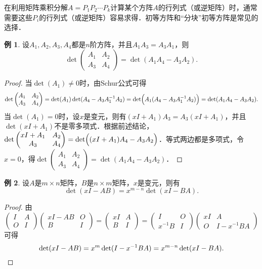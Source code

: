 \documentclass[a4paper,fontset=windows]{ctexbook}
\theoremstyle{definition}
\newtheorem{example}{例}[chapter]
\begin{document}
\medskip 在利用矩阵乘积分解$A=P_1P_2\cdots P_k$计算某个方阵$A$的行列式（或逆矩阵）时，通常需要这些$P_i$的行列式（或逆矩阵）容易求得．初等方阵和“分块”初等方阵是常见的选择．

\begin{example}
设$A_1,A_2,A_3,A_4$都是$n$阶方阵，并且$A_1A_3=A_3A_1$，则
$$\det\begin{pmatrix}A_1&A_2 \\ A_3&A_4\end{pmatrix}=\det(A_1A_4-A_3A_2).$$
\end{example}

\begin{proof}
当$\det(A_1)\ne 0$时，由Schur公式可得
$$\det\begin{pmatrix}A_1&A_2 \\ A_3&A_4\end{pmatrix}=\det(A_1)\det(A_4-A_3A_1^{-1}A_2)=\det\Bigl(A_1(A_4-A_3A_1^{-1}A_2)\Bigr)=\det(A_1A_4-A_3A_2).$$
当$\det(A_1)=0$时，设$x$是变元，则有$(xI+A_1)A_3=A_3(xI+A_1)$，并且$\det(xI+A_1)$不是零多项式．根据前述结论，
$\det\begin{pmatrix}xI+A_1&A_2 \\ A_3&A_4\end{pmatrix}=\det\Bigl((xI+A_1)A_4-A_3A_2\Bigr)$．等式两边都是多项式，令$x=0$，得$\det\begin{pmatrix}A_1&A_2 \\ A_3&A_4\end{pmatrix}=\det(A_1A_4-A_3A_2)$．
\end{proof}

\begin{example}\label{ex3.12}
设$A$是$m\times n$矩阵，$B$是$n\times m$矩阵，$x$是变元，则有
$$\det(xI-AB)=x^{m-n}\det(xI-BA).$$
\end{example}

\begin{proof}
由
$$\begin{pmatrix}I&A \\ O&I\end{pmatrix}\begin{pmatrix}xI-AB&O \\ B&I\end{pmatrix}=\begin{pmatrix}xI&A \\ B&I\end{pmatrix}=\begin{pmatrix}I&O \\ x^{-1}B&I\end{pmatrix}\begin{pmatrix}xI&A \\ O&I-x^{-1}BA\end{pmatrix}$$
可得
\begin{equation*}
\det(xI-AB)=x^m\det(I-x^{-1}BA)=x^{m-n}\det(xI-BA). \qedhere
\end{equation*}
\end{proof}
\end{document}
